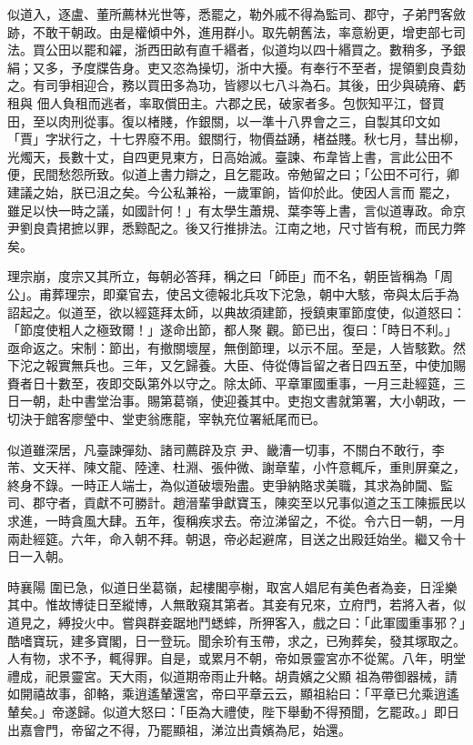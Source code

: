 \begin{pinyinscope}
 似道入，逐盧、董所薦林光世等，悉罷之，勒外戚不得為監司、郡守，子弟門客斂跡，不敢干朝政。由是權傾中外，進用群小。取先朝舊法，率意紛更，增吏部七司法。買公田以罷和糴，浙西田畝有直千緡者，似道均以四十緡買之。數稍多，予銀絹；又多，予度牒告身。吏又恣為操切，浙中大擾。有奉行不至者，提領劉良貴劾之。有司爭相迎合，務以買田多為功，皆繆以七八斗為石。其後，田少與磽瘠、虧租與
 佃人負租而逃者，率取償田主。六郡之民，破家者多。包恢知平江，督買田，至以肉刑從事。復以楮賤，作銀關，以一準十八界會之三，自製其印文如「賈」字狀行之，十七界廢不用。銀關行，物價益踴，楮益賤。秋七月，彗出柳，光燭天，長數十丈，自四更見東方，日高始滅。臺諫、布韋皆上書，言此公田不便，民間愁怨所致。似道上書力辯之，且乞罷政。帝勉留之曰；「公田不可行，卿建議之始，朕已沮之矣。今公私兼裕，一歲軍餉，皆仰於此。使因人言而
 罷之，雖足以快一時之議，如國計何！」有太學生蕭規、葉李等上書，言似道專政。命京尹劉良貴捃摭以罪，悉黥配之。後又行推排法。江南之地，尺寸皆有稅，而民力弊矣。



 理宗崩，度宗又其所立，每朝必答拜，稱之曰「師臣」而不名，朝臣皆稱為「周公」。甫葬理宗，即棄官去，使呂文德報北兵攻下沱急，朝中大駭，帝與太后手為詔起之。似道至，欲以經筵拜太師，以典故須建節，授鎮東軍節度使，似道怒曰：「節度使粗人之極致爾！」遂命出節，都人聚
 觀。節已出，復曰：「時日不利。」亟命返之。宋制：節出，有撤關壞屋，無倒節理，以示不屈。至是，人皆駭歎。然下沱之報實無兵也。三年，又乞歸養。大臣、侍從傳旨留之者日四五至，中使加賜賚者日十數至，夜即交臥第外以守之。除太師、平章軍國重事，一月三赴經筵，三日一朝，赴中書堂治事。賜第葛嶺，使迎養其中。吏抱文書就第署，大小朝政，一切決于館客廖瑩中、堂吏翁應龍，宰執充位署紙尾而已。



 似道雖深居，凡臺諫彈劾、諸司薦辟及京
 尹、畿漕一切事，不關白不敢行，李芾、文天祥、陳文龍、陸達、杜淵、張仲微、謝章輩，小忤意輒斥，重則屏棄之，終身不錄。一時正人端士，為似道破壞殆盡。吏爭納賂求美職，其求為帥閫、監司、郡守者，貢獻不可勝計。趙溍輩爭獻寶玉，陳奕至以兄事似道之玉工陳振民以求進，一時貪風大肆。五年，復稱疾求去。帝泣涕留之，不從。令六日一朝，一月兩赴經筵。六年，命入朝不拜。朝退，帝必起避席，目送之出殿廷始坐。繼又令十日一入朝。



 時襄陽
 圍已急，似道日坐葛嶺，起樓閣亭榭，取宮人娼尼有美色者為妾，日淫樂其中。惟故博徒日至縱博，人無敢窺其第者。其妾有兄來，立府門，若將入者，似道見之，縛投火中。嘗與群妾踞地鬥蟋蟀，所狎客入，戲之曰：「此軍國重事邪？」酷嗜寶玩，建多寶閣，日一登玩。聞余玠有玉帶，求之，已殉葬矣，發其塚取之。人有物，求不予，輒得罪。自是，或累月不朝，帝如景靈宮亦不從駕。八年，明堂禮成，祀景靈宮。天大雨，似道期帝雨止升輅。胡貴嬪之父顯
 祖為帶御器械，請如開禧故事，卻輅，乘逍遙輦還宮，帝曰平章云云，顯祖紿曰：「平章已允乘逍遙輦矣。」帝遂歸。似道大怒曰：「臣為大禮使，陛下舉動不得預聞，乞罷政。」即日出嘉會門，帝留之不得，乃罷顯祖，涕泣出貴嬪為尼，始還。




\end{pinyinscope}
